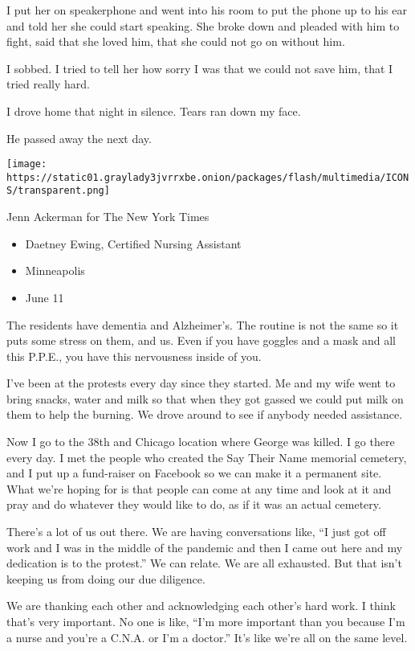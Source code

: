 I put her on speakerphone and went into his room to put the phone up to
his ear and told her she could start speaking. She broke down and
pleaded with him to fight, said that she loved him, that she could not
go on without him.

I sobbed. I tried to tell her how sorry I was that we could not save
him, that I tried really hard.

I drove home that night in silence. Tears ran down my face.

He passed away the next day.

\texttt{[image: https://static01.graylady3jvrrxbe.onion/packages/flash/multimedia/ICONS/transparent.png]}

Jenn Ackerman for The New York Times

\begin{itemize}
\tightlist
\item
  Daetney Ewing, Certified Nursing Assistant
\item
  Minneapolis
\item
  June 11
\end{itemize}

The residents have dementia and Alzheimer's. The routine is not the same
so it puts some stress on them, and us. Even if you have goggles and a
mask and all this P.P.E., you have this nervousness inside of you.

I've been at the protests every day since they started. Me and my wife
went to bring snacks, water and milk so that when they got gassed we
could put milk on them to help the burning. We drove around to see if
anybody needed assistance.

Now I go to the 38th and Chicago location where George was killed. I go
there every day. I met the people who created the Say Their Name
memorial cemetery, and I put up a fund-raiser on Facebook so we can make
it a permanent site. What we're hoping for is that people can come at
any time and look at it and pray and do whatever they would like to do,
as if it was an actual cemetery.

There's a lot of us out there. We are having conversations like, ``I
just got off work and I was in the middle of the pandemic and then I
came out here and my dedication is to the protest.'' We can relate. We
are all exhausted. But that isn't keeping us from doing our due
diligence.

We are thanking each other and acknowledging each other's hard work. I
think that's very important. No one is like, ``I'm more important than
you because I'm a nurse and you're a C.N.A. or I'm a doctor.'' It's like
we're all on the same level.

